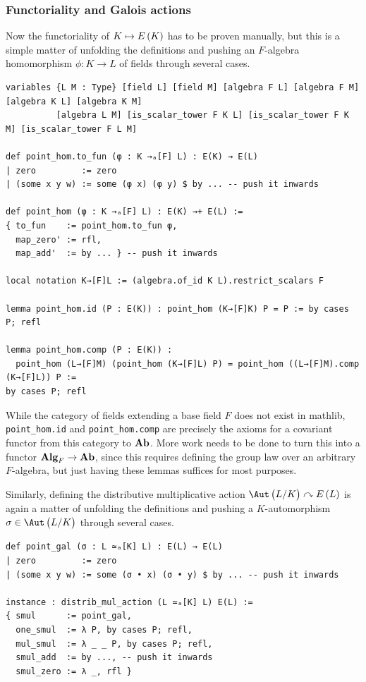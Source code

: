 \subsubsection{Functoriality and Galois actions}

Now the functoriality of $ K \mapsto E\br{K} $ has to be proven manually, but this is a simple matter of unfolding the definitions and pushing an $ F $-algebra homomorphism $ \phi : K \to L $ of fields through several cases.

\begin{lstlisting}[frame=single]
variables {L M : Type} [field L] [field M] [algebra F L] [algebra F M] [algebra K L] [algebra K M]
          [algebra L M] [is_scalar_tower F K L] [is_scalar_tower F K M] [is_scalar_tower F L M]

def point_hom.to_fun (φ : K →ₐ[F] L) : E(K) → E(L)
| zero         := zero
| (some x y w) := some (φ x) (φ y) $ by ... -- push it inwards

def point_hom (φ : K →ₐ[F] L) : E(K) →+ E(L) :=
{ to_fun    := point_hom.to_fun φ,
  map_zero' := rfl,
  map_add'  := by ... } -- push it inwards

local notation K→[F]L := (algebra.of_id K L).restrict_scalars F

lemma point_hom.id (P : E(K)) : point_hom (K→[F]K) P = P := by cases P; refl

lemma point_hom.comp (P : E(K)) :
  point_hom (L→[F]M) (point_hom (K→[F]L) P) = point_hom ((L→[F]M).comp (K→[F]L)) P :=
by cases P; refl
\end{lstlisting}

While the category of fields extending a base field $ F $ does not exist in mathlib, \texttt{point\_hom.id} and \texttt{point\_hom.comp} are precisely the axioms for a covariant functor from this category to $ \textbf{Ab} $. More work needs to be done to turn this into a functor $ \textbf{Alg}_F \to \textbf{Ab} $, since this requires defining the group law over an arbitrary $ F $-algebra, but just having these lemmas suffices for most purposes.

\pagebreak

Similarly, defining the distributive multiplicative action $ \Aut\br{L / K} \curvearrowright E\br{L} $ is again a matter of unfolding the definitions and pushing a $ K $-automorphism $ \sigma \in \Aut\br{L / K} $ through several cases.

\begin{lstlisting}[frame=single]
def point_gal (σ : L ≃ₐ[K] L) : E(L) → E(L)
| zero         := zero
| (some x y w) := some (σ • x) (σ • y) $ by ... -- push it inwards

instance : distrib_mul_action (L ≃ₐ[K] L) E(L) :=
{ smul      := point_gal,
  one_smul  := λ P, by cases P; refl,
  mul_smul  := λ _ _ P, by cases P; refl,
  smul_add  := by ..., -- push it inwards
  smul_zero := λ _, rfl }
\end{lstlisting}

